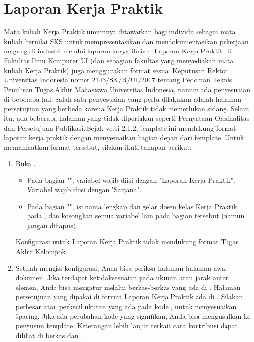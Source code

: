 \section{Laporan Kerja Praktik}
\label{sec:laporanKerjaPraktik}
Mata kuliah Kerja Praktik umumnya ditawarkan bagi individu sebagai mata kuliah bernilai SKS untuk mempresentasikan dan mendokumentasikan pekerjaan magang di industri melalui laporan karya ilmiah.
Laporan Kerja Praktik di Fakultas Ilmu Komputer UI (dan sebagian fakultas yang menyediakan mata kuliah Kerja Praktik) juga menggunakan format sesuai Keputusan Rektor Universitas Indonesia nomor 2143/SK/R/UI/2017 tentang Pedoman Teknis Penulisan Tugas Akhir Mahasiswa Universitas Indonesia, namun ada penyesuaian di beberapa hal.
Salah satu penyesuaian yang perlu dilakukan adalah halaman persetujuan yang berbeda karena Kerja Praktik tidak memerlukan sidang.
Selain itu, ada beberapa halaman yang tidak diperlukan seperti Pernyataan Orisinalitas dan Persetujuan Publikasi.
Sejak versi 2.1.2, \f{template} ini mendukung \f{format} laporan kerja praktik dengan menyesuaikan bagian depan dari \f{template}.
Untuk memanfaatkan \f{format} tersebut, silakan ikuti tahapan berikut:
\begin{enumerate}
\item Buka .
\begin{itemize}
	\item Pada bagian "", variabel  wajib diisi dengan "Laporan Kerja Praktik".
	Variabel  wajib diisi dengan "Sarjana".
	\item Pada bagian "", isi nama lengkap dan gelar dosen kelas Kerja Praktik pada , dan kosongkan semua variabel lain pada bagian tersebut (namun jangan dihapus).
\end{itemize}
Konfigurasi untuk Laporan Kerja Praktik tidak mendukung format Tugas Akhir Kelompok.
\item Setelah mengisi konfigurasi, Anda bisa periksa halaman-halaman awal dokumen. Jika terdapat ketidaksesuaian pada ukuran atau jarak antar elemen, Anda bisa mengatur melalui berkas-berkas yang ada di .
Halaman persetujuan yang dipakai di format Laporan Kerja Praktik ada di .
Silakan perbesar atau perkecil ukuran yang ada pada kode , untuk menyesuaikan \f{spacing}.
Jika ada perubahan kode yang signifikan, Anda bisa mengusulkan ke penyusun \f{template}.
Keterangan lebih lanjut terkait cara kontribusi dapat dilihat di berkas  dan .
\end{enumerate}


